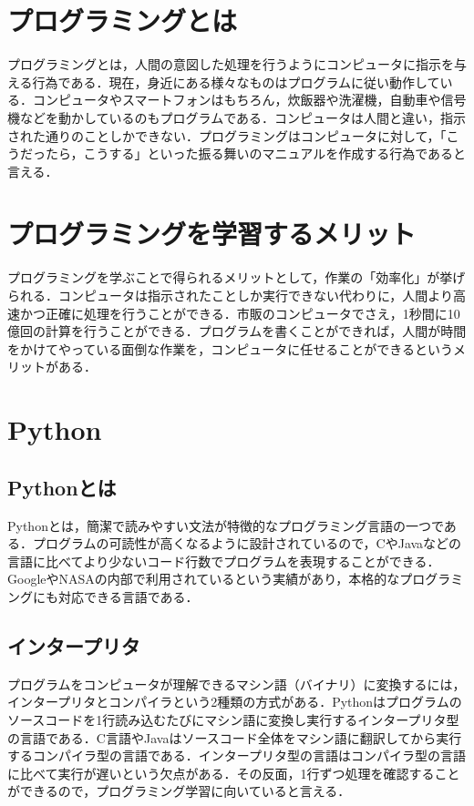 \section{プログラミングとは}
プログラミングとは，人間の意図した処理を行うようにコンピュータに指示を与える行為である．現在，身近にある様々なものはプログラムに従い動作している．コンピュータやスマートフォンはもちろん，炊飯器や洗濯機，自動車や信号機などを動かしているのもプログラムである．コンピュータは人間と違い，指示された通りのことしかできない．プログラミングはコンピュータに対して，「こうだったら，こうする」といった振る舞いのマニュアルを作成する行為であると言える．


\section{プログラミングを学習するメリット}
プログラミングを学ぶことで得られるメリットとして，作業の「効率化」が挙げられる．コンピュータは指示されたことしか実行できない代わりに，人間より高速かつ正確に処理を行うことができる．市販のコンピュータでさえ，1秒間に10億回の計算を行うことができる．プログラムを書くことができれば，人間が時間をかけてやっている面倒な作業を，コンピュータに任せることができるというメリットがある．


\section{Python}


\subsection{Pythonとは}
Pythonとは，簡潔で読みやすい文法が特徴的なプログラミング言語の一つである．プログラムの可読性が高くなるように設計されているので，CやJavaなどの言語に比べてより少ないコード行数でプログラムを表現することができる．GoogleやNASAの内部で利用されているという実績があり，本格的なプログラミングにも対応できる言語である．


\subsection{インタープリタ}
プログラムをコンピュータが理解できるマシン語（バイナリ）に変換するには，インタープリタとコンパイラという2種類の方式がある．Pythonはプログラムのソースコードを1行読み込むたびにマシン語に変換し実行するインタープリタ型の言語である．C言語やJavaはソースコード全体をマシン語に翻訳してから実行するコンパイラ型の言語である．インタープリタ型の言語はコンパイラ型の言語に比べて実行が遅いという欠点がある．その反面，1行ずつ処理を確認することができるので，プログラミング学習に向いていると言える．


